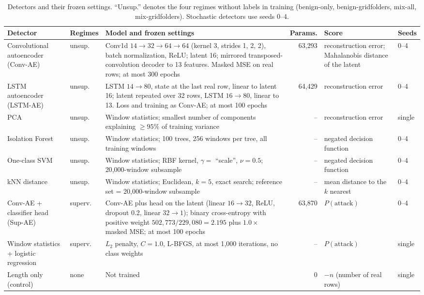 \begin{table}[t]
\caption{Detectors and their frozen settings. ``Unsup.'' denotes the four regimes without labels in training
(benign-only, benign-gridfolders, mix-all, mix-gridfolders). Stochastic detectors use seeds 0--4.}
\label{tab:detectors}
\centering
\footnotesize
\setlength{\tabcolsep}{4pt}
\begin{tabular}{@{}p{2.5cm}p{1.1cm}p{7.4cm}rp{2.9cm}l@{}}
\toprule
Detector & Regimes & Model and frozen settings & Params. & Score & Seeds \\
\midrule
Convolutional autoencoder (Conv-AE) & unsup. &
Conv1d $14{\to}32{\to}64{\to}64$ (kernel 3, strides 1, 2, 2), batch normalization, ReLU; latent 16; mirrored
transposed-convolution decoder to 13 features. Masked MSE on real rows; at most 300 epochs &
63{,}293 & reconstruction error; Mahalanobis distance of the latent & 0--4 \\
LSTM autoencoder (LSTM-AE) & unsup. &
LSTM $14{\to}80$, state at the last real row, linear to latent 16; latent repeated over 32 rows, LSTM
$16{\to}80$, linear to 13. Loss and training as Conv-AE; at most 100 epochs &
64{,}429 & reconstruction error & 0--4 \\
PCA & unsup. &
Window statistics; smallest number of components explaining $\ge 95\%$ of training variance &
-- & reconstruction error & single \\
Isolation Forest & unsup. &
Window statistics; 100 trees, 256 windows per tree, all training windows &
-- & negated decision function & 0--4 \\
One-class SVM & unsup. &
Window statistics; RBF kernel, $\gamma=$ ``scale'', $\nu=0.5$; 20{,}000-window subsample &
-- & negated decision function & 0--4 \\
kNN distance & unsup. &
Window statistics; Euclidean, $k=5$, exact search; reference set = 20{,}000-window subsample &
-- & mean distance to the $k$ nearest & 0--4 \\
\midrule
Conv-AE + classifier head (Sup-AE) & superv. &
Conv-AE plus head on the latent (linear $16{\to}32$, ReLU, dropout 0.2, linear $32{\to}1$); binary cross-entropy
with positive weight $502{,}773/229{,}080=2.195$ plus $1.0\times$ masked MSE; at most 100 epochs &
63{,}870 & $P(\text{attack})$ & 0--4 \\
Window statistics + logistic regression & superv. &
$L_2$ penalty, $C=1.0$, L-BFGS, at most 1{,}000 iterations, no class weights &
-- & $P(\text{attack})$ & single \\
\midrule
Length only (control) & none & Not trained & 0 & $-n$ (number of real rows) & single \\
\bottomrule
\end{tabular}
\end{table}

